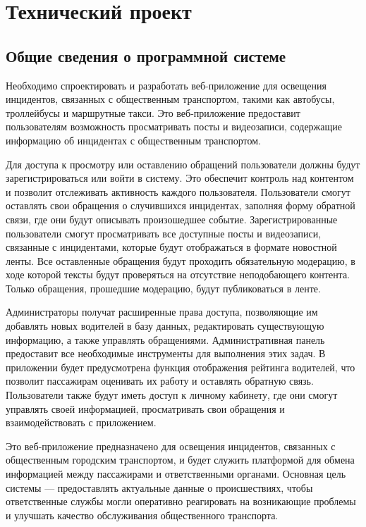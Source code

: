\section{Технический проект}
\subsection{Общие сведения о программной системе}

Необходимо спроектировать и разработать веб-приложение для освещения инцидентов, связанных с общественным транспортом, такими как автобусы, троллейбусы и маршрутные такси. Это веб-приложение предоставит пользователям возможность просматривать посты и видеозаписи, содержащие информацию об инцидентах с общественным транспортом.

Для доступа к просмотру или оставлению обращений пользователи должны будут зарегистрироваться или войти в систему. Это обеспечит контроль над контентом и позволит отслеживать активность каждого пользователя. Пользователи смогут оставлять свои обращения о случившихся инцидентах, заполняя форму обратной связи, где они будут описывать произошедшее событие. Зарегистрированные пользователи смогут просматривать все доступные посты и видеозаписи, связанные с инцидентами, которые будут отображаться в формате новостной ленты. Все оставленные обращения будут проходить обязательную модерацию, в ходе которой тексты будут проверяться на отсутствие неподобающего контента. Только обращения, прошедшие модерацию, будут публиковаться в ленте.

Администраторы получат расширенные права доступа, позволяющие им добавлять новых водителей в базу данных, редактировать существующую информацию, а также управлять обращениями. Административная панель предоставит все необходимые инструменты для выполнения этих задач. В приложении будет предусмотрена функция отображения рейтинга водителей, что позволит пассажирам оценивать их работу и оставлять обратную связь. Пользователи также будут иметь доступ к личному кабинету, где они смогут управлять своей информацией, просматривать свои обращения и взаимодействовать с приложением.

Это веб-приложение предназначено для освещения инцидентов, связанных с общественным городским транспортом, и будет служить платформой для обмена информацией между пассажирами и ответственными органами. Основная цель системы — предоставлять актуальные данные о происшествиях, чтобы ответственные службы могли оперативно реагировать на возникающие проблемы и улучшать качество обслуживания общественного транспорта.

